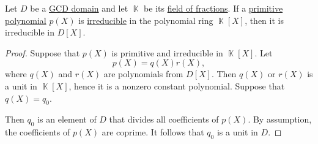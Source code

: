 \begin{lemma}\label{thm:irreducible_primitive_polynomial_in_field_of_fractions}
  Let \( D \) be a \hyperref[def:gcd_domain]{GCD domain} and let \( \BbbK \) be its \hyperref[thm:field_of_fractions]{field of fractions}. If a \hyperref[def:polynomial_content]{primitive polynomial} \( p(X) \) is \hyperref[def:domain_divisibility/irreducible]{irreducible} in the polynomial ring \( \BbbK[X] \), then it is irreducible in \( D[X] \).
\end{lemma}
\begin{proof}
  Suppose that \( p(X) \) is primitive and irreducible in \( \BbbK[X] \). Let
  \begin{equation*}
    p(X) = q(X) r(X),
  \end{equation*}
  where \( q(X) \) and \( r(X) \) are polynomials from \( D[X] \). Then \( q(X) \) or \( r(X) \) is a unit in \( \BbbK[X] \), hence it is a nonzero constant polynomial. Suppose that \( q(X) = q_0 \).

  Then \( q_0 \) is an element of \( D \) that divides all coefficients of \( p(X) \). By assumption, the coefficients of \( p(X) \) are coprime. It follows that \( q_0 \) is a unit in \( D \).
\end{proof}

